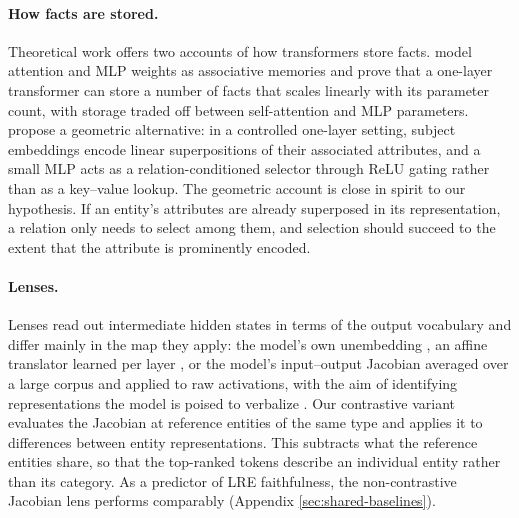 \paragraph{How facts are stored.} Theoretical work offers two accounts of
how transformers store facts.
\citet{nichani2025understanding} model attention and MLP
weights as associative memories and prove that a one-layer transformer
can store a number of facts that scales linearly with its parameter
count, with storage traded off between self-attention and MLP
parameters. \citet{DBLP:journals/corr/abs-2605-12426} propose a
geometric alternative: in a controlled one-layer setting, subject
embeddings encode linear superpositions of their associated attributes,
and a small MLP acts as a relation-conditioned selector through ReLU
gating rather than as a key--value lookup. The geometric account is
close in spirit to our hypothesis. If an entity's attributes are already
superposed in its representation, a relation only needs to select among
them, and selection should succeed to the extent that the attribute is
prominently encoded.

\paragraph{Lenses.} Lenses read out intermediate hidden states in terms of
the output vocabulary and differ mainly in the map they apply: the
model's own unembedding
\citep{nostalgebraist2020interpreting}, an affine translator
learned per layer \citep{belrose2023eliciting}, or
the model's input--output Jacobian averaged over a large corpus and
applied to raw activations, with the aim of identifying representations
the model is poised to verbalize
\citep{gurnee2026workspace}.
Our contrastive variant evaluates the Jacobian at reference entities of
the same type and applies it to differences between entity
representations. This subtracts what the reference entities share, so
that the top-ranked tokens describe an individual entity rather than its
category. As a predictor of LRE faithfulness, the non-contrastive
Jacobian lens performs comparably (Appendix \ref{sec:shared-baselines}).